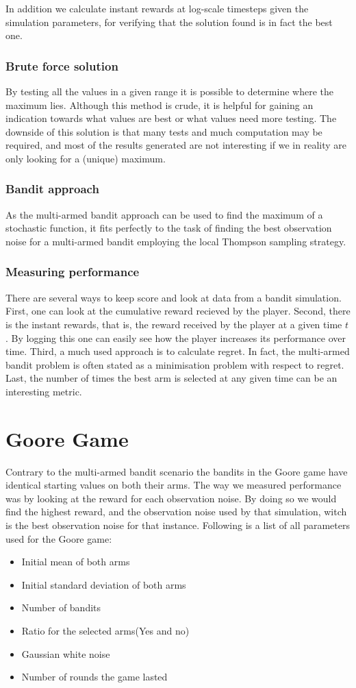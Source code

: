 In addition we calculate instant rewards at log-scale timesteps given the simulation parameters, for verifying that the solution found is in fact the best one.

\subsubsection{Brute force solution}
By testing all the values in a given range it is possible to determine where the maximum lies.
Although this method is crude, it is helpful for gaining an indication towards what values are best or what values need more testing.
The downside of this solution is that many tests and much computation may be required, and most of the results generated are not interesting if we in reality are only looking for a (unique) maximum.

\subsubsection{Bandit approach}
As the multi-armed bandit approach can be used to find the maximum of a
stochastic function, it fits perfectly to the task of finding the best
observation noise for a multi-armed bandit employing the local Thompson
sampling strategy.

\subsubsection{Measuring performance}
There are several ways to keep score and look at data from a bandit simulation.
First, one can look at the cumulative reward recieved by the player.
Second, there is the instant rewards, that is, the reward received by the player at a given time $t$.
By logging this one can easily see how the player increases its performance over time.
Third, a much used approach is to calculate regret.
In fact, the multi-armed bandit problem is often stated as a minimisation problem with respect to regret.
Last, the number of times the best arm is selected at any given time can be an interesting metric.

\section{Goore Game}
Contrary to the multi-armed bandit scenario the bandits in the Goore game have identical starting
values on both their arms. The way we measured performance was by looking at the reward for each observation
noise. By doing so we would find the highest reward, and the observation noise used by that simulation, witch
is the best observation noise for that instance. Following is a list of all parameters used for the Goore game:
\begin{itemize}
\item Initial mean of both arms
\item Initial standard deviation of both arms
\item Number of bandits
\item Ratio for the selected arms(Yes and no)
\item Gaussian white noise
\item Number of rounds the game lasted
\end{itemize}

